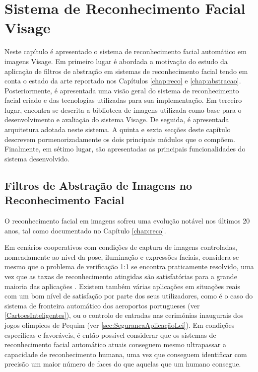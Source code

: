 \chapter{Sistema de Reconhecimento Facial Visage} \label{chap:visage}

Neste capítulo é apresentado o sistema de reconhecimento facial automático em imagens Visage.  Em primeiro lugar é abordada a motivação do estudo da aplicação de filtros de abstração em sistemas de reconhecimento facial tendo em conta o estado da arte reportado nos Capítulos \ref{chap:reco} e \ref{chap:abstracao}. Posteriormente, é apresentada uma visão geral do sistema de reconhecimento facial criado e das tecnologias utilizadas para sua implementação. Em terceiro lugar, encontra-se descrita a biblioteca de imagens utilizada como base para o desenvolvimento e avaliação do sistema Visage. De seguida, é apresentada arquitetura adotada neste sistema. A quinta e sexta secções deste capítulo descrevem pormenorizadamente os dois principais módulos que o compõem. Finalmente, em sétimo lugar, são apresentadas as principais funcionalidades do sistema desenvolvido.


\section{Filtros de Abstração de Imagens no Reconhecimento Facial}
O reconhecimento facial em imagens sofreu uma evolução notável nos últimos 20 anos, tal como documentado no Capítulo \ref{chap:reco}. 

Em cenários cooperativos com condições de captura de imagens controladas, nomeadamente ao nível da pose, iluminação e expressões faciais, considera-se mesmo que o problema de verificação 1:1 se encontra praticamente resolvido, uma vez que as taxas de reconhecimento atingidas são satisfatórias para a grande maioria das aplicações \cite{Li2011}. Existem também várias aplicações em situações reais com um bom nível de satisfação por parte dos seus utilizadores, como é o caso do sistema de fronteira automático dos aeroportos portugueses (ver \ref{CartoesInteligentes}), ou o controlo de entradas nas cerimónias inaugurais dos jogos olímpicos de Pequim (ver \ref{sec:SegurancaAplicaçãoLei}). Em condições específicas e favoráveis, é então possível considerar que os sistemas de reconhecimento facial automático atuais conseguem mesmo ultrapassar a capacidade de reconhecimento humana, uma vez que conseguem identificar com precisão um maior número de faces do que aquelas que um humano consegue.

